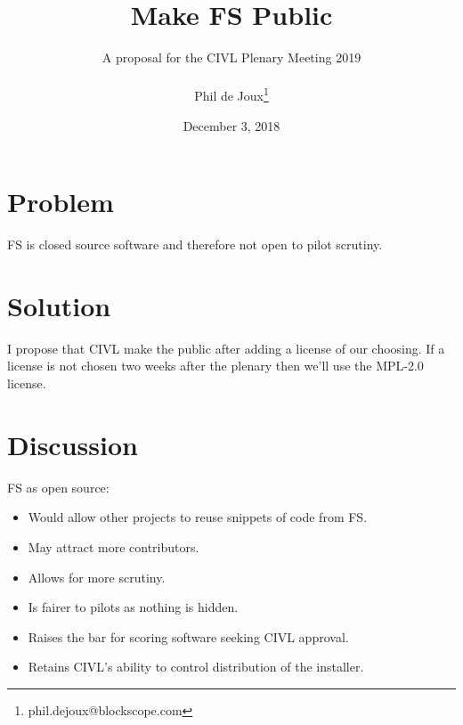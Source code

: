 \documentclass{article}
\title{Make FS Public}
\date{December 3, 2018}
\author{A proposal for the CIVL Plenary Meeting 2019\\\\
Phil de Joux\thanks{phil.dejoux@blockscope.com}}
\begin{document}
\maketitle
\section*{Problem}
FS is closed source software and therefore not open to pilot scrutiny.

\section*{Solution}
I propose that CIVL make the  public after adding a license of our choosing. If a license is not
chosen two weeks after the plenary then we'll use the MPL-2.0 license.

\section*{Discussion}
FS as open source:\\
\begin{itemize}
    \item Would allow other projects to reuse snippets of code from FS.
    \item May attract more contributors.
    \item Allows for more scrutiny.
    \item Is fairer to pilots as nothing is hidden.
    \item Raises the bar for scoring software seeking CIVL approval.
    \item Retains CIVL's ability to control distribution of the installer\footnotemark.
\end{itemize}
\end{document}
